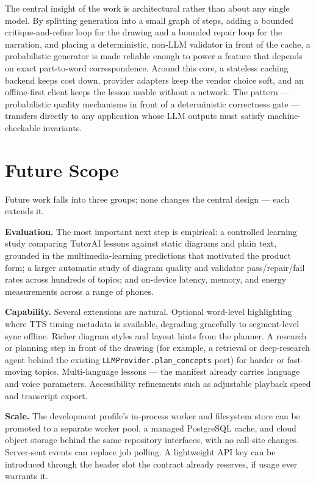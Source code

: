 The central insight of the work is architectural rather than about any
single model. By splitting generation into a small graph of steps, adding a
bounded critique-and-refine loop for the drawing and a bounded repair loop
for the narration, and placing a deterministic, non-LLM validator in front
of the cache, a probabilistic generator is made reliable enough to power a
feature that depends on exact part-to-word correspondence. Around this core,
a stateless caching backend keeps cost down, provider adapters keep the
vendor choice soft, and an offline-first client keeps the lesson usable
without a network. The pattern --- probabilistic quality mechanisms in front
of a deterministic correctness gate --- transfers directly to any
application whose LLM outputs must satisfy machine-checkable invariants.

\section{Future Scope}
\label{sec:futurescope}

Future work falls into three groups; none changes the central design ---
each extends it.

\textbf{Evaluation.} The most important next step is empirical: a controlled
learning study comparing TutorAI lessons against static diagrams and plain
text, grounded in the multimedia-learning predictions that motivated the
product form; a larger automatic study of diagram quality and validator
pass/repair/fail rates across hundreds of topics; and on-device latency,
memory, and energy measurements across a range of phones.

\textbf{Capability.} Several extensions are natural. Optional word-level
highlighting where TTS timing metadata is available, degrading gracefully to
segment-level sync offline. Richer diagram styles and layout hints from the
planner. A research or planning step in front of the drawing (for example, a
retrieval or deep-research agent behind the existing
\texttt{LLMProvider.plan\_concepts} port) for harder or fast-moving topics.
Multi-language lessons --- the manifest already carries language and voice
parameters. Accessibility refinements such as adjustable playback speed and
transcript export.

\textbf{Scale.} The development profile's in-process worker and filesystem
store can be promoted to a separate worker pool, a managed PostgreSQL cache,
and cloud object storage behind the same repository interfaces, with no
call-site changes. Server-sent events can replace job polling. A lightweight
API key can be introduced through the header slot the contract already
reserves, if usage ever warrants it.
